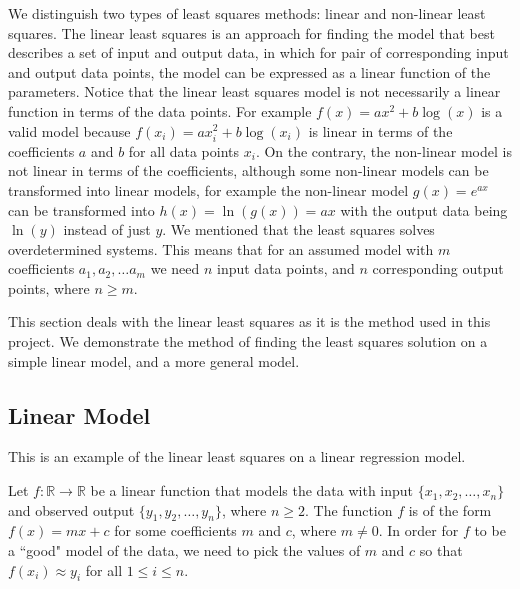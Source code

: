 \documentclass[11pt, oneside, reqno]{book}
\begin{document}
We distinguish two types of least squares methods: linear and non-linear least squares. The linear least squares is an approach for finding the model that best describes a set of input and output data, in which for pair of corresponding input and output data points, the model can be expressed as a linear function of the parameters. Notice that the linear least squares model is not necessarily a linear function in terms of the data points. For example $f(x) = ax^2 + b\log(x)$ is a valid model because $f(x_i) = ax_i^2 + b\log(x_i)$ is linear in terms of the coefficients $a$ and $b$ for all data points $x_i$. On the contrary, the non-linear model is not linear in terms of the coefficients, although some non-linear models can be transformed into linear models, for example the non-linear model $g(x) = e^{ax}$ can be transformed into $h(x) = \ln\left(g(x)\right) = ax$ with the output data being $\ln(y)$ instead of just $y$. We mentioned that the least squares solves overdetermined systems. This means that for an assumed model with $m$ coefficients $a_1, a_2, \dots a_m$ we need $n$ input data points, and $n$ corresponding output points, where $n \ge m$. 

This section deals with the linear least squares as it is the method used in this project. We demonstrate the method of finding the least squares solution on a simple linear model, and a more general model.


\subsection{Linear Model}
	This is an example of the linear least squares on a linear regression model.
	
	Let $f: \mathbb{R} \to \mathbb{R}$ be a linear function that models the data with input $\{x_1, x_2, \dots, x_n\}$ and observed output $\{y_1, y_2, \dots, y_n\}$, where $n \ge 2$. The function $f$ is of the form $f(x) = mx+c$ for some coefficients $m$ and $c$, where $m\not= 0$. In order for $f$ to be a ``good" model of the data, we need to pick the values of $m$ and $c$ so that $f(x_i) \approx y_i$ for all $1 \le i \le n$.
	
\end{document}
